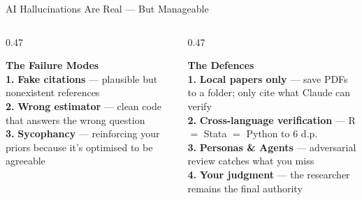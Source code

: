 \documentclass[aspectratio=169, 11pt]{beamer}
\newcommand{\emphgold}[1]{\alert{\textbf{#1}}}
\begin{document}
\begin{frame}{AI Hallucinations Are Real --- But Manageable}
\begin{columns}[T]
\begin{column}{0.47\textwidth}
  \begin{tcolorbox}[
    enhanced, colback=red!5, colframe=red!30, boxrule=0.5pt,
    sharp corners, left=8pt, right=8pt, top=6pt, bottom=6pt,
  ]
    {\normalsize\bfseries\color{coral} The Failure Modes}\\[6pt]
    {\small \emphgold{1.} \textbf{Fake citations} --- plausible but nonexistent references}\\[4pt]
    {\small \emphgold{2.} \textbf{Wrong estimator} --- clean code that answers the wrong question}\\[4pt]
    {\small \emphgold{3.} \textbf{Sycophancy} --- reinforcing your priors because it's optimised to be agreeable}
  \end{tcolorbox}
\end{column}
\begin{column}{0.47\textwidth}
  \begin{tcolorbox}[
    enhanced, colback=green!5, colframe=green!30!black, boxrule=0.5pt,
    sharp corners, left=8pt, right=8pt, top=6pt, bottom=6pt,
  ]
    {\normalsize\bfseries\color{sage} The Defences}\\[6pt]
    {\small \emphgold{1.} \textbf{Local papers only} --- save PDFs to a folder; only cite what Claude can verify}\\[4pt]
    {\small \emphgold{2.} \textbf{Cross-language verification} --- R $=$ Stata $=$ Python to 6 d.p.}\\[4pt]
    {\small \emphgold{3.} \textbf{Personas \& Agents} --- adversarial review catches what you miss}\\[4pt]
    {\small \emphgold{4.} \textbf{Your judgment} --- the researcher remains the final authority}
  \end{tcolorbox}
\end{column}
\end{columns}
\end{frame}
\end{document}
